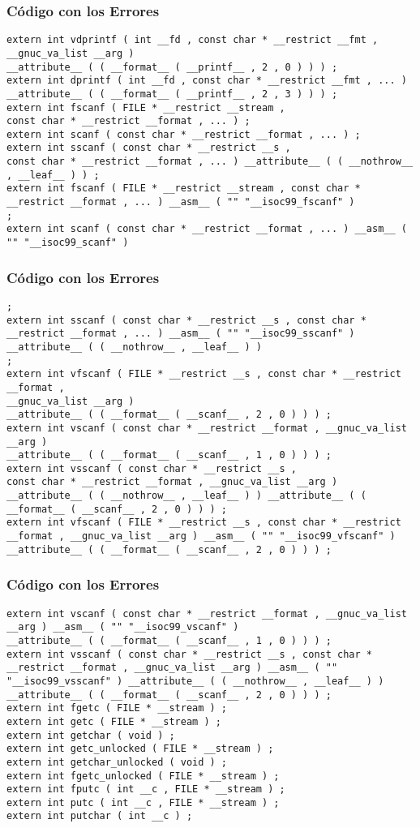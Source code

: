 \documentclass{beamer}
\begin{document}
\begin{frame}[fragile]
\frametitle{C\'odigo con los Errores}
\begin{lstlisting}[style=CStyle]
extern int vdprintf ( int __fd , const char * __restrict __fmt , 
__gnuc_va_list __arg ) 
__attribute__ ( ( __format__ ( __printf__ , 2 , 0 ) ) ) ; 
extern int dprintf ( int __fd , const char * __restrict __fmt , ... ) 
__attribute__ ( ( __format__ ( __printf__ , 2 , 3 ) ) ) ; 
extern int fscanf ( FILE * __restrict __stream , 
const char * __restrict __format , ... ) ; 
extern int scanf ( const char * __restrict __format , ... ) ; 
extern int sscanf ( const char * __restrict __s , 
const char * __restrict __format , ... ) __attribute__ ( ( __nothrow__ , __leaf__ ) ) ; 
extern int fscanf ( FILE * __restrict __stream , const char * __restrict __format , ... ) __asm__ ( "" "__isoc99_fscanf" ) 
; 
extern int scanf ( const char * __restrict __format , ... ) __asm__ ( "" "__isoc99_scanf" ) 
\end{lstlisting}
\end{frame}
\begin{frame}[fragile]
\frametitle{C\'odigo con los Errores}
\begin{lstlisting}[style=CStyle]
; 
extern int sscanf ( const char * __restrict __s , const char * __restrict __format , ... ) __asm__ ( "" "__isoc99_sscanf" ) __attribute__ ( ( __nothrow__ , __leaf__ ) ) 
; 
extern int vfscanf ( FILE * __restrict __s , const char * __restrict __format , 
__gnuc_va_list __arg ) 
__attribute__ ( ( __format__ ( __scanf__ , 2 , 0 ) ) ) ; 
extern int vscanf ( const char * __restrict __format , __gnuc_va_list __arg ) 
__attribute__ ( ( __format__ ( __scanf__ , 1 , 0 ) ) ) ; 
extern int vsscanf ( const char * __restrict __s , 
const char * __restrict __format , __gnuc_va_list __arg ) 
__attribute__ ( ( __nothrow__ , __leaf__ ) ) __attribute__ ( ( __format__ ( __scanf__ , 2 , 0 ) ) ) ; 
extern int vfscanf ( FILE * __restrict __s , const char * __restrict __format , __gnuc_va_list __arg ) __asm__ ( "" "__isoc99_vfscanf" ) 
__attribute__ ( ( __format__ ( __scanf__ , 2 , 0 ) ) ) ; 
\end{lstlisting}
\end{frame}
\begin{frame}[fragile]
\frametitle{C\'odigo con los Errores}
\begin{lstlisting}[style=CStyle]
extern int vscanf ( const char * __restrict __format , __gnuc_va_list __arg ) __asm__ ( "" "__isoc99_vscanf" ) 
__attribute__ ( ( __format__ ( __scanf__ , 1 , 0 ) ) ) ; 
extern int vsscanf ( const char * __restrict __s , const char * __restrict __format , __gnuc_va_list __arg ) __asm__ ( "" "__isoc99_vsscanf" ) __attribute__ ( ( __nothrow__ , __leaf__ ) ) 
__attribute__ ( ( __format__ ( __scanf__ , 2 , 0 ) ) ) ; 
extern int fgetc ( FILE * __stream ) ; 
extern int getc ( FILE * __stream ) ; 
extern int getchar ( void ) ; 
extern int getc_unlocked ( FILE * __stream ) ; 
extern int getchar_unlocked ( void ) ; 
extern int fgetc_unlocked ( FILE * __stream ) ; 
extern int fputc ( int __c , FILE * __stream ) ; 
extern int putc ( int __c , FILE * __stream ) ; 
extern int putchar ( int __c ) ; 
\end{lstlisting}
\end{frame}
\end{document}
